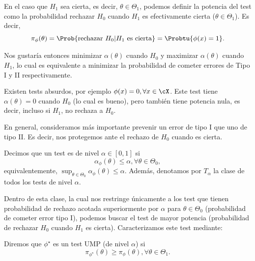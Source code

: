 \begin{definition}
En el caso que $H_1$ sea cierta, es decir, $\theta\in\Theta_1$, podemos definir la potencia del test como la probabilidad rechazar $H_0$ cuando $H_1$ es efectivamente cierta ($\theta\in\Theta_1$). Es decir,
\begin{equation}
 	\pi_\phi(\theta) = \Prob{\text{rechazar } H_0 | H_1 \text{ es cierta}}  = \Probtu{\phi(x)=1}.
 \end{equation}
 \end{definition}
Nos gustaría entonces minimizar $\alpha(\theta)$ cuando $H_0$ y maximizar $\alpha(\theta)$ cuando $H_1$, lo cual es equivalente a minimizar la probabilidad de cometer errores de Tipo I y II respectivamente. 


\begin{example}
	Existen tests absurdos, por ejemplo $\phi(x) = 0,\forall x\in\cX$. Este test tiene $\alpha(\theta)=0$ cuando $H_0$ (lo cual es bueno), pero también tiene potencia nula, es decir, incluso si $H_1$, no rechaza a $H_0$. 
 \end{example} 
 En general, consideramos más importante prevenir un error de tipo I que uno de tipo II. Es decir, nos protegemos ante el rechazo de $H_0$ cuando es cierta. 

 \begin{definition}
 Decimos que un test es de nivel $\alpha\in[0,1]$ si 
\begin{equation}
 		\alpha_\phi(\theta)\leq\alpha, \forall \theta\in\Theta_0,
 	\end{equation}
 	equivalentemente, $\sup_{\theta\in\Theta_0}\alpha_\phi(\theta)\leq\alpha$. Además, denotamos por $T_\alpha$ la clase de todos los tests de nivel $\alpha$. 
 \end{definition}
 Dentro de esta clase, la cual nos restringe únicamente a los test que tienen probabilidad de rechazo acotada superiormente por $\alpha$  para $\theta\in\Theta_0$ (probabilidad de cometer error tipo I), podemos buscar el test de mayor potencia (probabilidad de rechazar $H_0$ cuando $H_1$ es cierta). Caracterizamos este test mediante: 

 \begin{definition}
 	Diremos que $\phi^\star$ es un test UMP (de nivel $\alpha$)  si 
 	\begin{equation}
 		\pi_{\phi^\star}(\theta)\geq \pi_{\phi}(\theta), \forall\theta\in\Theta_1.
 	\end{equation}
 	
 \end{definition}


